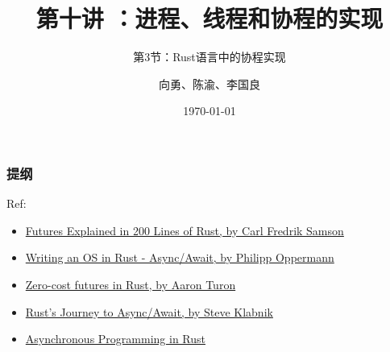 


\title[第10讲]{第十讲 ：进程、线程和协程的实现} %
\subtitle{第3节：Rust语言中的协程实现}
\author{向勇、陈渝、李国良} %
\date{\today} %



\begin{frame}
\titlepage %
\end{frame}

\begin{frame}
\frametitle{提纲} %
\tableofcontents %

\tiny
Ref:
\begin{itemize}
	\item \href{https://cfsamson.github.io/books-futures-explained/}{Futures Explained in 200 Lines of Rust, by Carl Fredrik Samson}
	\item \href{https://os.phil-opp.com/async-await/}{Writing an OS in Rust - Async/Await, by Philipp Oppermann}
	\item \href{https://aturon.github.io/tech/2016/08/11/futures/}{Zero-cost futures in Rust, by Aaron Turon}
	\item \href{https://www.infoq.com/presentations/rust-2019/}{Rust’s Journey to Async/Await, by Steve Klabnik}
	\item \href{https://rust-lang.github.io/async-book/index.html}{Asynchronous Programming in Rust}
\end{itemize}


\end{frame}
